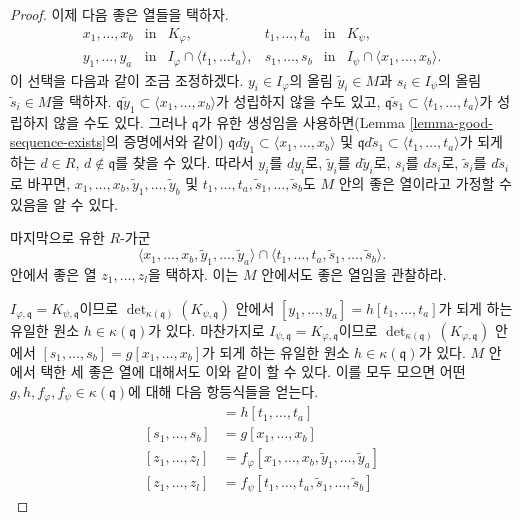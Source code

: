 \begin{proof}
\medskip\noindent
이제 다음 좋은 열들을 택하자.
$$
\begin{matrix}
x_1, \ldots, x_b & \text{in} & K_\varphi, &
t_1, \ldots, t_a & \text{in} & K_\psi, \\
y_1, \ldots, y_a & \text{in} & I_\varphi \cap \langle t_1, \ldots t_a\rangle, &
s_1, \ldots, s_b & \text{in} & I_\psi \cap \langle x_1, \ldots, x_b\rangle.
\end{matrix}
$$
이 선택을 다음과 같이 조금 조정하겠다. $y_i \in I_\varphi$의
올림 $\tilde y_i \in M$과 $s_i \in I_\psi$의 올림
$\tilde s_i \in M$을 택하자.
$\mathfrak q \tilde y_1 \subset \langle x_1, \ldots, x_b\rangle$가
성립하지 않을 수도 있고,
$\mathfrak q \tilde s_1 \subset \langle t_1, \ldots, t_a\rangle$가
성립하지 않을 수도 있다. 그러나 $\mathfrak q$가 유한 생성임을
사용하면(Lemma \ref{lemma-good-sequence-exists}의 증명에서와 같이)
$\mathfrak q d\tilde y_1 \subset \langle x_1, \ldots, x_b\rangle$ 및
$\mathfrak q d\tilde s_1 \subset \langle t_1, \ldots, t_a\rangle$가
되게 하는 $d \in R$, $d \not \in \mathfrak q$를 찾을 수 있다.
따라서 $y_i$를 $dy_i$로, $\tilde y_i$를 $d\tilde y_i$로, $s_i$를
$ds_i$로, $\tilde s_i$를 $d\tilde s_i$로 바꾸면,
$x_1, \ldots, x_b, \tilde y_1, \ldots, \tilde y_b$ 및
$t_1, \ldots, t_a, \tilde s_1, \ldots, \tilde s_b$도 $M$ 안의 좋은
열이라고 가정할 수 있음을 알 수 있다.

\medskip\noindent
마지막으로 유한 $R$-가군
$$
\langle
x_1, \ldots, x_b, \tilde y_1, \ldots, \tilde y_a
\rangle
\cap
\langle
t_1, \ldots, t_a, \tilde s_1, \ldots, \tilde s_b
\rangle.
$$
안에서 좋은 열 $z_1, \ldots, z_l$을 택하자. 이는 $M$ 안에서도 좋은
열임을 관찰하라.

\medskip\noindent
$I_{\varphi, \mathfrak q} = K_{\psi, \mathfrak q}$이므로
$\det_{\kappa(\mathfrak q)}(K_{\psi, \mathfrak q})$ 안에서
$[y_1, \ldots, y_a] = h [t_1, \ldots, t_a]$가 되게 하는 유일한 원소
$h \in \kappa(\mathfrak q)$가 있다. 마찬가지로
$I_{\psi, \mathfrak q} = K_{\varphi, \mathfrak q}$이므로
$\det_{\kappa(\mathfrak q)}(K_{\varphi, \mathfrak q})$ 안에서
$[s_1, \ldots, s_b] = g [x_1, \ldots, x_b]$가 되게 하는 유일한 원소
$h \in \kappa(\mathfrak q)$가 있다. $M$ 안에서 택한 세 좋은 열에
대해서도 이와 같이 할 수 있다. 이를 모두 모으면 어떤
$g, h, f_\varphi, f_\psi \in \kappa(\mathfrak q)$에 대해 다음 항등식들을
얻는다.
\begin{align*}
[y_1, \ldots, y_a]
& =
h [t_1, \ldots, t_a] \\
[s_1, \ldots, s_b]
& =
g [x_1, \ldots, x_b] \\
[z_1, \ldots, z_l]
& =
f_\varphi [x_1, \ldots, x_b, \tilde y_1, \ldots, \tilde y_a] \\
[z_1, \ldots, z_l]
& =
f_\psi [t_1, \ldots, t_a, \tilde s_1, \ldots, \tilde s_b]
\end{align*}


\end{proof}
